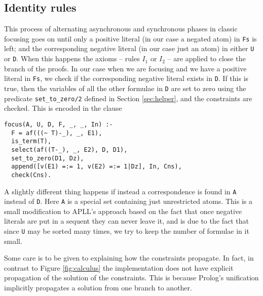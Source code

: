 \subsection{Identity rules}\label{sec:identity}
This process of alternating asynchronous and synchronous phases in classic focusing goes on until only a positive literal (in our case a negated atom) in \texttt{Fs} is left; and the corresponding negative literal (in our case just an atom) in either \texttt{U} or \texttt{D}.
When this happens the axioms -- rules $I_1$ or $I_2$ -- are applied to close the branch of the proofs.
In our case when we are focusing and we have a positive literal in \texttt{Fs}, we check if the corresponding negative literal exists in \texttt{D}.
If this is true, then the variables of all the other formulae in \texttt{D} are set to zero using the predicate \texttt{set\_to\_zero/2} defined in Section \ref{sec:helper}, and the constraints are checked.
This is encoded in the clause 
\begin{verbatim}
focus(A, U, D, F, _, _, In) :-
  F = af(((~ T)-_), _, E1),
  is_term(T),
  select(af((T-_), _, E2), D, D1),
  set_to_zero(D1, Dz),
  append([v(E1) =:= 1, v(E2) =:= 1|Dz], In, Cns),
  check(Cns).
\end{verbatim}
A slightly different thing happens if instead a correspondence is found in \texttt{A} instead of \texttt{D}.
Here \texttt{A} is a special set containing just unrestricted atoms.
This is a small modification to APLL's approach based on the fact that once negative literals are put in a sequent they can never leave it, and is due to the fact that since \texttt{U} may be sorted many times, we try to keep the number of formulae in it small.

Some care is to be given to explaining how the constraints propagate.
In fact, in contrast to Figure \ref{fig:calculus} the implementation does not have explicit propagation of the solution of the constraints.
This is because Prolog's unification implicitly propagates a solution from one branch to another.

